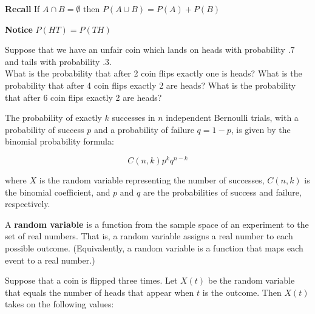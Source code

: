 \noindent \textbf{Recall} If $A\cap B=\emptyset$ then $P(A \cup B)=P(A)+P(B)$

\noindent \textbf{Notice} $P(HT)=P(TH)$
\begin{exmp}
Suppose that we have an unfair coin which lands on heads with probability $.7$ and tails with probability $.3$.
\\
What is the probability that after 2 coin flips exactly one is heads?
\newline
\vspace{1cm}
\newline
What is the probability that after 4 coin flips exactly 2 are heads?
\newline
\vspace{1cm}
\newline
What is the probability that after 6 coin flips exactly 2 are heads?
\newline
\vspace{1cm}


\end{exmp}
\begin{defn}
The probability of exactly \(k\) successes in \(n\) independent Bernoulli trials, with a probability of success \(p\) and a probability of failure \(q = 1 - p\), is given by the binomial probability formula:

\[
C(n, k) p^k q^{n-k}
\]

where \(X\) is the random variable representing the number of successes, \(C(n, k)\) is the binomial coefficient, and \(p\) and \(q\) are the probabilities of success and failure, respectively.

\end{defn}

\begin{defn}
A \textbf{random variable} is a function from the sample space of an experiment to the set of real numbers. That is, a random variable assigns a real number to each possible outcome. (Equivalently, a random variable is a function that maps each event to a real number.)
\end{defn}

\begin{exmp}
Suppose that a coin is flipped three times. Let \(X(t)\) be the random variable that equals the
number of heads that appear when \(t\) is the outcome. Then \(X(t)\) takes on the following values:
\newline
\vspace{2cm}
\end{exmp}

